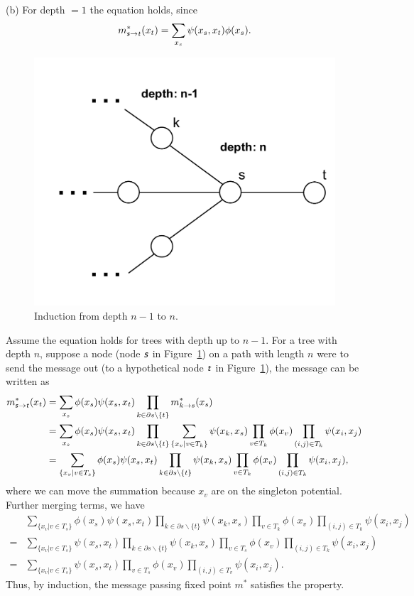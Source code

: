 \documentclass{article}
\newcommand{\s}[1]{\textsf{\textit{#1}}}
\newcommand{\qeds}{\hfill\qedsymbol}
\begin{document}
%
\noindent
(b) For depth $= 1$ the equation holds, since
\begin{align*}
m_{\s{s}\to\s{t}}^*(x_t) &= \sum_{x_s}\psi(x_s, x_t)\phi(x_s).\\
\end{align*}
%
\begin{figure}[h]
  \centering
  \includegraphics[width=0.4\columnwidth]{5b.pdf}
  \vspace{-0.1cm}
  \caption{Induction from depth $n-1$ to $n$.}
  \label{f:5b}
\end{figure}
%
Assume the equation holds for trees with depth up to $n-1$. For a tree with depth $n$,
suppose a node (node $\s{s}$ in Figure~\ref{f:5b}) on a path with length $n$
were to send the message out (to a hypothetical node $\s{t}$ in Figure~\ref{f:5b}),
the message can be written as
\begin{align*}
	m_{\s{s}\to\s{t}}^*(x_t) &= \sum_{x_s}\phi(x_s)\psi(x_s, x_t)\prod_{k\in \partial s \backslash\{t\}}m^*_{k\to s}(x_s)\\
	&=\sum_{x_s}\phi(x_s)\psi(x_s, x_t)\prod_{k\in \partial s \backslash\{t\}}\sum_{\{x_v|v\in T_k\}}\psi(x_k, x_s)\prod_{v\in T_k}\phi(x_v)\prod_{(i,j)\in T_k}\psi(x_i, x_j)\\
	&=\sum_{\{x_v|v\in T_s\}}\phi(x_s)\psi(x_s, x_t)\prod_{k\in \partial s \backslash\{t\}}\psi(x_k, x_s)\prod_{v\in T_k}\phi(x_v)\prod_{(i,j)\in T_k}\psi(x_i, x_j),
\end{align*}
where we can move the summation because $x_v$ are on the singleton potential. Further merging terms, we have
\begin{align*}
&\sum_{\{x_v|v\in T_s\}}\phi(x_s)\psi(x_s, x_t)\prod_{k\in \partial s \backslash\{t\}}\psi(x_k, x_s)\prod_{v\in T_k}\phi(x_v)\prod_{(i,j)\in T_k}\psi(x_i, x_j)\\
= &\sum_{\{x_v|v\in T_s\}}\psi(x_s, x_t)\prod_{k\in \partial s \backslash\{t\}}\psi(x_k, x_s)\prod_{v\in T_s}\phi(x_v)\prod_{(i,j)\in T_k}\psi(x_i, x_j)\\
= &\sum_{\{x_v|v\in T_s\}}\psi(x_s, x_t)\prod_{v\in T_s}\phi(x_v)\prod_{(i,j)\in T_v}\psi(x_i, x_j).
\end{align*}
Thus, by induction, the message passing fixed point $m^*$ satisfies the property. \qeds
\\
\end{document}
